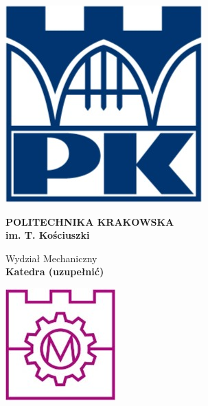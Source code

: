 \begin{titlepage}


\begin{figure}[!htb]
    \centering
    \begin{minipage}{0.2\textwidth}
        \includegraphics[width=0.7\linewidth]{images/loga/PK_logo.jpg}
    \end{minipage}
    \begin{minipage}{0.5\textwidth}
        \large
        \vspace{0.2cm}
        \fontsize{14pt}{16pt}\selectfont
        \begin{center}
            \textbf{POLITECHNIKA KRAKOWSKA \\ im. T. Kościuszki}
        \end{center}
        \begin{center}
                Wydział Mechaniczny \\
                \textbf{Katedra (uzupełnić)
                }
        \end{center}
    \end{minipage}
    \begin{minipage}{0.2\textwidth}
        \includegraphics[width=0.7\linewidth]{images/loga/wm_logo.jpg}
    \end{minipage}
\end{figure}


\end{titlepage}
